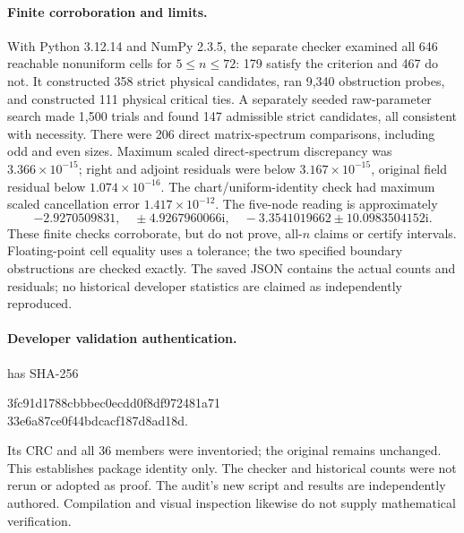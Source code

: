 \documentclass[11pt]{article}
\newcommand{\ii}{\mathrm i}
\begin{document}
\paragraph{Finite corroboration and limits.}
With Python 3.12.14 and NumPy 2.3.5, the separate checker examined all
646 reachable nonuniform cells for $5\le n\le72$: 179 satisfy the
criterion and 467 do not. It constructed 358 strict physical candidates,
ran 9,340 obstruction probes, and constructed 111 physical critical ties.
A separately seeded raw-parameter search made 1,500 trials and found 147
admissible strict candidates, all consistent with necessity. There were
206 direct matrix-spectrum comparisons, including odd and even sizes.
Maximum scaled direct-spectrum discrepancy was $3.366\times10^{-15}$;
right and adjoint residuals were below $3.167\times10^{-15}$, original
field residual below $1.074\times10^{-16}$. The chart/uniform-identity
check had maximum scaled cancellation error $1.417\times10^{-12}$.
The five-node reading is approximately
\[
 -2.9270509831,\quad \pm4.9267960066\ii,\quad
 -3.3541019662\pm10.0983504152\ii.
\]
These finite checks corroborate, but do not prove, all-$n$ claims or certify
intervals. Floating-point cell equality uses a tolerance; the two specified
boundary obstructions are checked exactly. The saved JSON contains the
actual counts and residuals; no historical developer statistics are claimed
as independently reproduced.

\paragraph{Developer validation authentication.}
 has SHA-256
\begin{center}\ttfamily\small
3fc91d1788cbbbec0ecdd0f8df972481a71\\
33e6a87ce0f44bdcacf187d8ad18d.
\end{center}
Its CRC and all 36 members were inventoried; the original remains unchanged.
This establishes package identity only. The checker and historical counts
were not rerun or adopted as proof. The audit's new script and results are
independently authored. Compilation and visual inspection likewise do not
supply mathematical verification.
\end{document}
